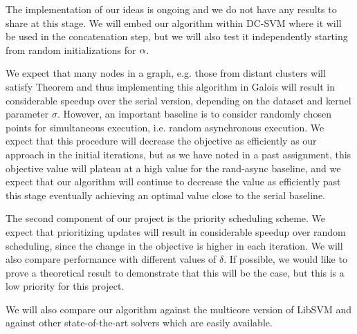 The implementation of our ideas is ongoing and we do not have any results to share at this stage. We will embed our algorithm within DC-SVM where it will be used in the concatenation step, but we will also test it independently starting from random initializations for $\alpha$.

We expect that many nodes in a graph, e.g. those from distant clusters will satisfy Theorem and thus implementing this algorithm in Galois will result in considerable speedup over the serial version, depending on the dataset and kernel parameter $\sigma$. However, an important baseline is to consider randomly chosen points for simultaneous execution, i.e. random asynchronous execution. We expect that this procedure will decrease the objective as efficiently as our approach in the initial iterations, but as we have noted in a past assignment, this objective value will plateau at a high value for the rand-async baseline, and we expect that our algorithm will continue to decrease the value as efficiently past this stage eventually achieving an optimal value close to the serial baseline.

The second component of our project is the priority scheduling scheme. We expect that prioritizing updates will result in considerable speedup over random scheduling, since the change in the objective is higher in each iteration. We will also compare performance with different values of $\delta$. If possible, we would like to prove a theoretical result to demonstrate that this will be the case, but this is a low priority for this project.

We will also compare our algorithm against the multicore version of LibSVM and against other state-of-the-art solvers which are easily available.
